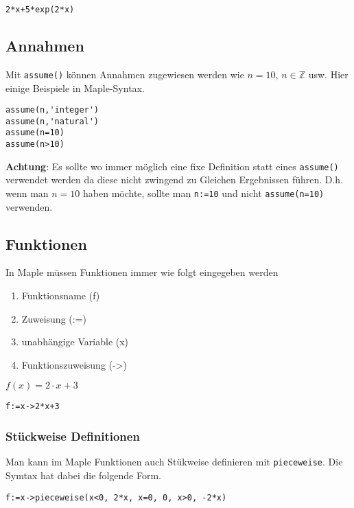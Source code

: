 \begin{lstlisting}[caption=Euler, label=Euler]
2*x+5*exp(2*x)
\end{lstlisting}


\subsection{Annahmen}
Mit \verb!assume()! können Annahmen zugewiesen werden wie $n = 10$, 
$n \in \mathbb{Z}$ usw. Hier einige Beispiele in Maple-Syntax.

\begin{lstlisting}[caption=Annahmen, label=Annahmen]
assume(n,'integer')
assume(n,'natural')
assume(n=10)
assume(n>10)
\end{lstlisting}

\noindent
\textbf{Achtung}: Es sollte wo immer möglich eine fixe Definition statt
eines \verb!assume()! verwendet werden da diese nicht zwingend zu Gleichen 
Ergebnissen führen. D.h. wenn man $n=10$ haben möchte, sollte man 
\verb!n:=10! und nicht \verb!assume(n=10)! verwenden.

\subsection{Funktionen}
In Maple müssen Funktionen immer wie folgt eingegeben werden
\begin{enumerate}
	\item Funktionsname (f)
	\item Zuweisung (:=)
	\item unabhängige Variable (x)
	\item Funktionszuweisung (->)
\end{enumerate}

$f(x)=2 \cdot x + 3$

\begin{lstlisting}[caption=Funktionen, label=Funktionen]
f:=x->2*x+3
\end{lstlisting}

\subsubsection{Stückweise Definitionen}
Man kann im Maple Funktionen auch Stükweise definieren mit \verb!pieceweise!.
Die Symtax hat dabei die folgende Form.

\begin{lstlisting}[caption=Stückweise Definition, label=Stückweise Definition]
f:=x->pieceweise(x<0, 2*x, x=0, 0, x>0, -2*x)
\end{lstlisting}

